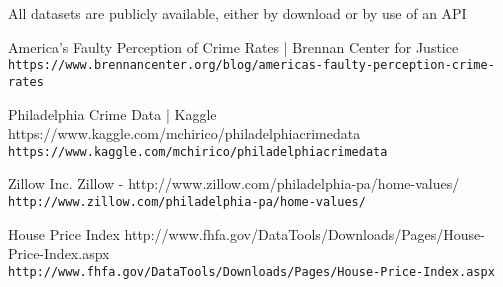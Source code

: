 \documentclass[12pt,letterpaper]{article}
\begin{document}
\begin{titlepage}
All datasets are publicly available, either by download or by use of an API


\begin{thebibliography}{9}
America's Faulty Perception of Crime Rates | Brennan Center for Justice
\\\texttt{https://www.brennancenter.org/blog/americas-faulty-perception-crime-rates}

Philadelphia Crime Data | Kaggle
https://www.kaggle.com/mchirico/philadelphiacrimedata
\\\texttt{https://www.kaggle.com/mchirico/philadelphiacrimedata}

Zillow
Inc. Zillow - http://www.zillow.com/philadelphia-pa/home-values/
\\\texttt{http://www.zillow.com/philadelphia-pa/home-values/}

House Price Index
http://www.fhfa.gov/DataTools/Downloads/Pages/House-Price-Index.aspx
\\\texttt{http://www.fhfa.gov/DataTools/Downloads/Pages/House-Price-Index.aspx}

 
\end{thebibliography}
\end{titlepage}
\end{document}
